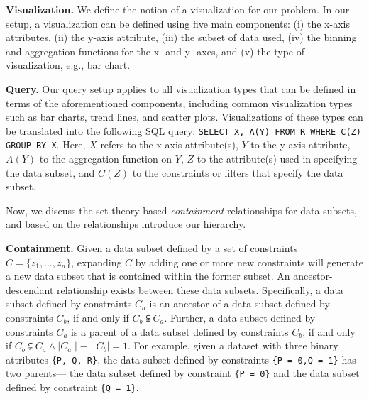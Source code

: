 
\textbf{Visualization.} We define the notion of a visualization for our problem. In our setup, a visualization can be defined using five main components: (i) the x-axis attributes, (ii) the y-axis attribute, (iii) the subset of data used, (iv) the binning and aggregation functions for the x- and y- axes, and (v) the type of visualization, e.g., bar chart.

\textbf{Query.} Our query setup applies to all visualization types that can be defined in terms of the aforementioned components, including common visualization types such as bar charts, trend lines, and scatter plots. Visualizations of these types can be translated into the following \textsc{SQL} query: {\tt SELECT X, A(Y) FROM R WHERE C(Z) GROUP BY X}. Here, $X$ refers to the x-axis attribute(s), $Y$ to the y-axis attribute, $A(Y)$ to the aggregation function on $Y$, $Z$ to the attribute(s) used in specifying the data subset, and $C(Z)$ to the constraints or filters that specify the data subset.

Now, we discuss the set-theory based \emph{containment} relationships for data subsets, and based on the relationships introduce our hierarchy.

\textbf{Containment.} Given a data subset defined by a set of constraints $C = \{z_1, \ldots, z_n\}$, expanding $C$ by adding one or more new constraints will generate a new data subset that is contained within the former subset. An ancestor-descendant relationship exists between these data subsets. Specifically, a data subset defined by constraints $C_a$ is an ancestor of a data subset defined by constraints $C_b$, if and only if $C_b \subsetneqq C_a$. Further, a data subset defined by constraints $C_a$ is a parent of a data subset defined by constraints $C_b$, if and only if $C_b \subsetneqq C_a \land \mid C_a \mid - \mid C_b \mid = 1$. For example, given a dataset with three binary attributes {\tt \{P, Q, R\}}, the data subset defined by constraints {\tt \{P = 0,Q = 1\}} has two parents--- the data subset defined by constraint {\tt \{P = 0\}} and the data subset defined by constraint {\tt \{Q = 1\}}.

